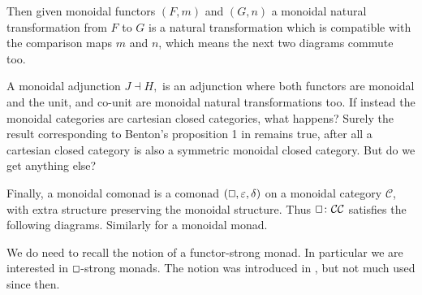 \documentclass{article}
\let\to\relax
\newcommand{\to}{\rightarrow}
\renewcommand{\Box}{\oblong}
\newcommand{\cat}[1]{\mathcal{#1}}
\begin{document}
Then given monoidal functors $(F,m)$ and $(G,n)$ a monoidal natural transformation from $F$ to $G$ is a natural transformation which is compatible with the comparison maps $m$ and $n$, which means the next two diagrams commute too.

A monoidal adjunction $J \dashv H, $ is an adjunction  where both functors are monoidal and the unit, and co-unit are monoidal natural transformations too. If instead the monoidal categories are cartesian closed categories, what happens? Surely the result corresponding to Benton's proposition 1 in \cite{benton1995} remains true, after all a cartesian closed category is also a symmetric monoidal closed category. But do we get anything else?

Finally,
a monoidal comonad is a comonad $(\Box,\varepsilon, \delta)$ on a monoidal category $\cat{C}$, with extra structure preserving the monoidal structure. Thus $\Box\colon \cat{C}\to \cat{C}$ satisfies the following diagrams.{}
Similarly for a monoidal monad.

We do need to recall the notion of a functor-strong monad. In particular we are interested in $\Box$-strong monads. The notion was introduced in \cite{CS4}, but not much used since then.
\end{document}
